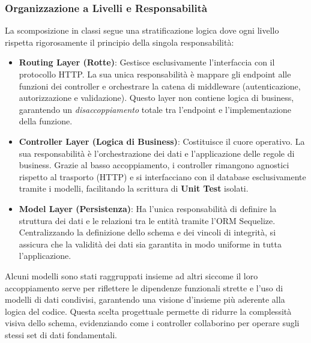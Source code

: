 \documentclass{article}
\begin{document}
\subsubsection{Organizzazione a Livelli e Responsabilità}
La scomposizione in classi segue una stratificazione logica dove ogni livello rispetta rigorosamente il principio della singola responsabilità:

\begin{itemize}
    \item \textbf{Routing Layer (Rotte)}: Gestisce esclusivamente l'interfaccia con il protocollo HTTP. La sua unica responsabilità è mappare gli endpoint alle funzioni dei controller e orchestrare la catena di middleware (autenticazione, autorizzazione e validazione). Questo layer non contiene logica di business, garantendo un \textit{disaccoppiamento} totale tra l'endpoint e l'implementazione della funzione.

    \item \textbf{Controller Layer (Logica di Business)}: Costituisce il cuore operativo. La sua responsabilità è l'orchestrazione dei dati e l'applicazione delle regole di business. Grazie al basso accoppiamento, i controller rimangono agnostici rispetto al trasporto (HTTP) e si interfacciano con il database esclusivamente tramite i modelli, facilitando la scrittura di \textbf{Unit Test} isolati.

    \item \textbf{Model Layer (Persistenza)}: Ha l'unica responsabilità di definire la struttura dei dati e le relazioni tra le entità tramite l'ORM Sequelize. Centralizzando la definizione dello schema e dei vincoli di integrità, si assicura che la validità dei dati sia garantita in modo uniforme in tutta l'applicazione.
\end{itemize}

\vspace{0.25cm} %
\noindent %
\begin{tcolorbox}[colback=gray!10,colframe=black,title=Nota schema UML]
    Alcuni modelli sono stati raggruppati insieme ad altri siccome il loro accoppiamento serve per riflettere le dipendenze funzionali strette e l'uso di modelli di dati condivisi, garantendo una visione d'insieme più aderente alla logica del codice. Questa scelta progettuale permette di ridurre la complessità visiva dello schema, evidenziando come i controller collaborino per operare sugli stessi set di dati fondamentali.
\end{tcolorbox}
\end{document}
